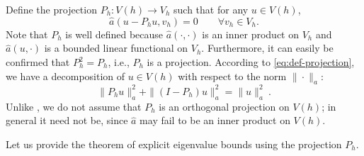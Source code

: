 \documentclass[a4,11pt]{article}
\numberwithin{equation}{section}
\begin{document}
\medskip

Define the projection $P_h: V(h) \rightarrow V_h$ such that for any $u\in V(h)$,
\begin{equation}
  \label{eq:def-projection}
\widehat{a}(u-P_hu,v_h)=0\quad\quad\forall v_h\in V_h.
\end{equation}
{Note that $P_h$ is well defined because $\widehat{a}(\cdot,\cdot)$ is an inner product on  $V_h$ and $\widehat{a}(u,\cdot)$ is a bounded linear functional on $V_h$.}
Furthermore, it can easily be confirmed that $P_h^2=P_h$, i.e., $P_h$ is a projection.
According to \eqref{eq:def-projection}, we have a decomposition of $u\in V(h)$ with respect to the norm $\|\cdot\|_a$: 
\begin{equation}
	\label{eq:orthogonal-decomposition-wrt-a-norm}
\|P_h u \|_a^2+\|(I-P_h)u\|_a^2=\|u\|_a^2~.
\end{equation} 
Unlike \cite{Liu-2015}, we do not assume that $P_h$ is an orthogonal projection on $V(h)$; in general it need not be, since $\widehat a$ may fail to be an inner product on $V(h)$.

\medskip

Let us provide the theorem of explicit eigenvalue bounds using the projection $P_h$.
\end{document}
